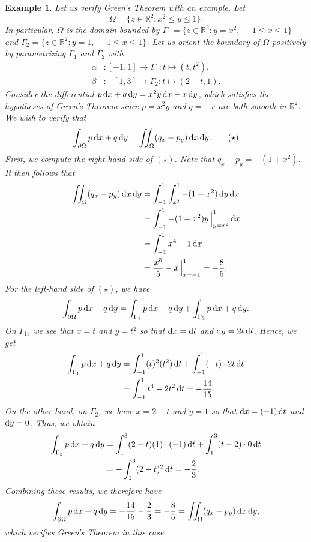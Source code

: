 \documentclass[10pt]{article}
\newcommand{\R}{\mathbb{R}}
\theoremstyle{newstyle}
\newtheorem{exmp}[thm]{Example}
\begin{document}
\begin{exmp}
Let us verify Green's Theorem with an example. Let 
\[ \Omega = \{z \in \R^2 : x^2 \leq y \leq 1\}. \]
In particular, $\Omega$ is the domain bounded by $\Gamma_1 = \{z \in \R^2 : y = x^2,\, -1 \leq 
x \leq 1\}$ and $\Gamma_2 = \{z \in \R^2 : y = 1,\, -1 \leq x \leq 1\}$. Let us orient the boundary 
of $\Omega$ positively by parametrizing $\Gamma_1$ and $\Gamma_2$ with 
\begin{align*}
    \alpha &: [-1, 1] \to \Gamma_1 : t \mapsto (t, t^2), \\ 
    \beta &: \;\;\, [1, 3] \to \Gamma_2 : t \mapsto (2-t, 1).
\end{align*}
Consider the differential $p\,{\rm d}x + q\,{\rm d}y = x^2y\,{\rm d}x - x\,{\rm d}y$, which satisfies 
the hypotheses of Green's Theorem since $p = x^2y$ and $q=-x$ are both smooth in $\R^2$. 
We wish to verify that 
\[ \int_{\partial\Omega} p\,{\rm d}x + q\,{\rm d}y = \iint_\Omega (q_x - p_y)\,{\rm d}x\,{\rm d}y. 
\tag{$\star$} \]
First, we compute the right-hand side of $(\star)$. Note that $q_x - p_y = -(1+x^2)$. It then 
follows that 
\begin{align*}
    \iint_\Omega (q_x - p_y)\,{\rm d}x\,{\rm d}y 
    &= \int_{-1}^1 \int_{x^2}^1 -(1+x^2)\,{\rm d}y\,{\rm d}x \\
    &= \int_{-1}^1 -(1+x^2)y \, \Big|_{y=x^2}^1\,{\rm d}x \\
    &= \int_{-1}^1 x^4 - 1 \,{\rm d}x \\
    &= \frac{x^5}5 - x\, \Big|_{x=-1}^1 = -\frac85.
\end{align*}
For the left-hand side of $(\star)$, we have 
\[ \int_{\partial\Omega} p\,{\rm d}x + q\,{\rm d}y 
= \int_{\Gamma_1} p\,{\rm d}x + q\,{\rm d}y + \int_{\Gamma_2} p\,{\rm d}x + q\,{\rm d}y. \]
On $\Gamma_1$, we see that $x=t$ and $y=t^2$ so that ${\rm d}x = {\rm d}t$ and 
${\rm d}y = 2t\,{\rm d}t$. Hence, we get 
\begin{align*}
    \int_{\Gamma_1} p\,{\rm d}x + q\,{\rm d}y 
    &= \int_{-1}^1 (t)^2(t^2)\,{\rm d}t + \int_{-1}^1 (-t) \cdot 2t\,{\rm d}t \\
    &= \int_{-1}^1 t^4 - 2t^2\,{\rm d}t = -\frac{14}{15}.
\end{align*}
On the other hand, on $\Gamma_2$, we have $x = 2-t$ and $y = 1$ so that ${\rm d}x = 
(-1)\,{\rm d}t$ and ${\rm d}y = 0$. Thus, we obtain 
\begin{align*}
    \int_{\Gamma_2} p\,{\rm d}x + q\,{\rm d}y 
    &= \int_1^3 (2-t)(1)\cdot (-1)\,{\rm d}t + \int_1^3 (t-2) \cdot 0\,{\rm d}t \\
    &= -\int_1^3 (2-t)^2\,{\rm d}t = -\frac23.
\end{align*}
Combining these results, we therefore have 
\[ \int_{\partial\Omega} p\,{\rm d}x + q\,{\rm d}y = -\frac{14}{15} - \frac23 = -\frac85 
= \iint_\Omega (q_x - p_y)\,{\rm d}x\,{\rm d}y, \]
which verifies Green's Theorem in this case.
\end{exmp}
\end{document}
